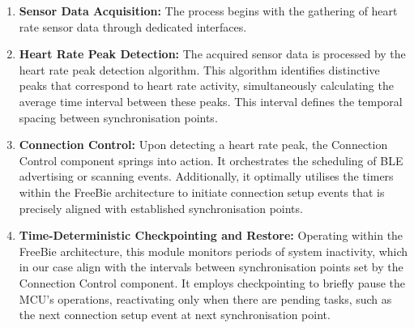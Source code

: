 \begin{enumerate}
    \item \textbf{Sensor Data Acquisition:} The process begins with the gathering of heart rate sensor data through dedicated interfaces.
    
    \item \textbf{Heart Rate Peak Detection:} The acquired sensor data is processed by the heart rate peak detection algorithm. This algorithm identifies distinctive peaks that correspond to heart rate activity, simultaneously calculating the average time interval between these peaks. This interval defines the temporal spacing between synchronisation points.
    
    \item \textbf{Connection Control:} Upon detecting a heart rate peak, the Connection Control component springs into action. It orchestrates the scheduling of BLE advertising or scanning events. Additionally, it optimally utilises the timers within the FreeBie architecture to initiate connection setup events that is precisely aligned with established synchronisation points.

    \item \textbf{Time-Deterministic Checkpointing and Restore:} Operating within the FreeBie architecture, this module monitors periods of system inactivity, which in our case align with the intervals between synchronisation points set by the Connection Control component. It employs checkpointing to briefly pause the MCU's operations, reactivating only when there are pending tasks, such as the next connection setup event at next synchronisation point.

\end{enumerate}